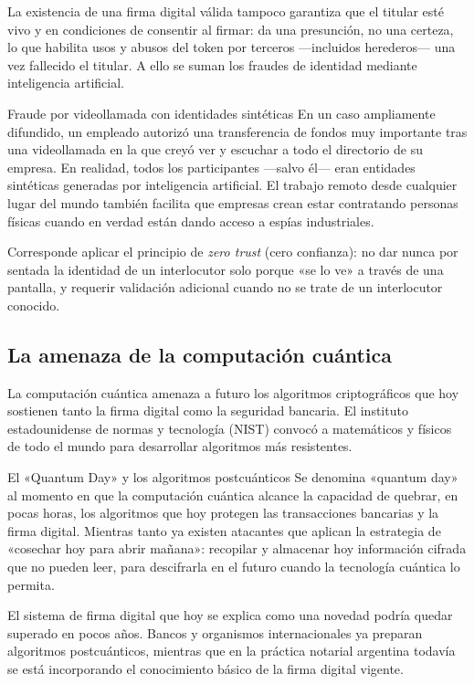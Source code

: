 \documentclass[12pt,oneside]{book}
\begin{document}
La existencia de una firma digital válida tampoco garantiza que el titular esté vivo y en condiciones de consentir al firmar: da una presunción, no una certeza, lo que habilita usos y abusos del token por terceros ---incluidos herederos--- una vez fallecido el titular. A ello se suman los fraudes de identidad mediante inteligencia artificial.

\begin{example}{Fraude por videollamada con identidades sintéticas}
En un caso ampliamente difundido, un empleado autorizó una transferencia de fondos muy importante tras una videollamada en la que creyó ver y escuchar a todo el directorio de su empresa. En realidad, todos los participantes ---salvo él--- eran entidades sintéticas generadas por inteligencia artificial. El trabajo remoto desde cualquier lugar del mundo también facilita que empresas crean estar contratando personas físicas cuando en verdad están dando acceso a espías industriales.
\end{example}

Corresponde aplicar el principio de \emph{zero trust} (cero confianza): no dar nunca por sentada la identidad de un interlocutor solo porque «se lo ve» a través de una pantalla, y requerir validación adicional cuando no se trate de un interlocutor conocido.

\subsection{La amenaza de la computación cuántica}

La computación cuántica amenaza a futuro los algoritmos criptográficos que hoy sostienen tanto la firma digital como la seguridad bancaria. El instituto estadounidense de normas y tecnología (NIST) convocó a matemáticos y físicos de todo el mundo para desarrollar algoritmos más resistentes.

\begin{example}{El «Quantum Day» y los algoritmos postcuánticos}
Se denomina «quantum day» al momento en que la computación cuántica alcance la capacidad de quebrar, en pocas horas, los algoritmos que hoy protegen las transacciones bancarias y la firma digital. Mientras tanto ya existen atacantes que aplican la estrategia de «cosechar hoy para abrir mañana»: recopilar y almacenar hoy información cifrada que no pueden leer, para descifrarla en el futuro cuando la tecnología cuántica lo permita.
\end{example}

\begin{important}
El sistema de firma digital que hoy se explica como una novedad podría quedar superado en pocos años. Bancos y organismos internacionales ya preparan algoritmos postcuánticos, mientras que en la práctica notarial argentina todavía se está incorporando el conocimiento básico de la firma digital vigente.
\end{important}
\end{document}

